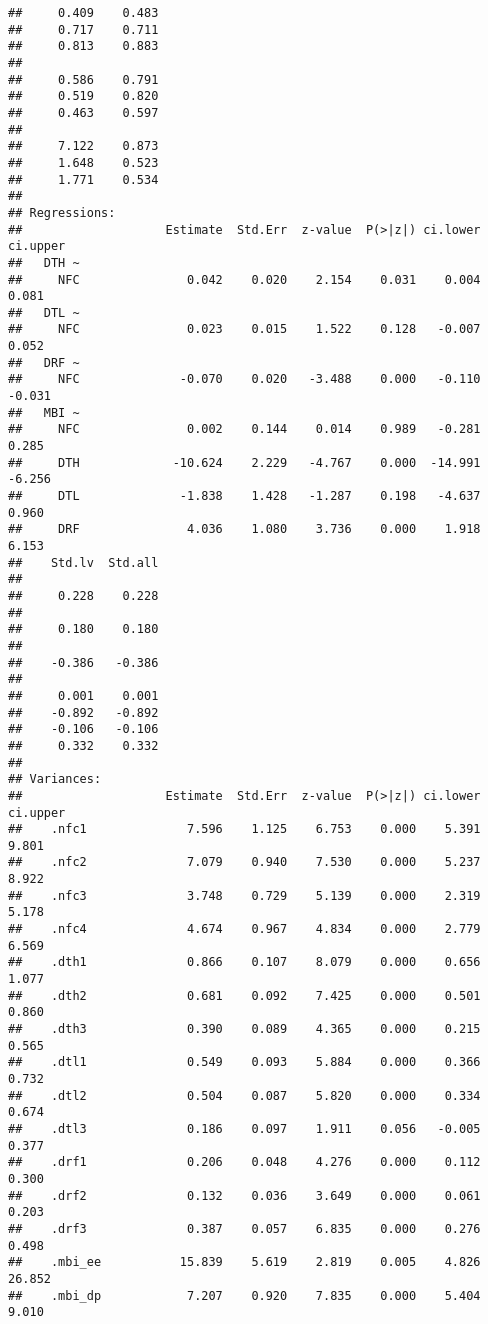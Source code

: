 \documentclass[
  english,
  man]{apa6}
\begin{document}
\begin{verbatim}
##     0.409    0.483
##     0.717    0.711
##     0.813    0.883
##                   
##     0.586    0.791
##     0.519    0.820
##     0.463    0.597
##                   
##     7.122    0.873
##     1.648    0.523
##     1.771    0.534
## 
## Regressions:
##                    Estimate  Std.Err  z-value  P(>|z|) ci.lower ci.upper
##   DTH ~                                                                 
##     NFC               0.042    0.020    2.154    0.031    0.004    0.081
##   DTL ~                                                                 
##     NFC               0.023    0.015    1.522    0.128   -0.007    0.052
##   DRF ~                                                                 
##     NFC              -0.070    0.020   -3.488    0.000   -0.110   -0.031
##   MBI ~                                                                 
##     NFC               0.002    0.144    0.014    0.989   -0.281    0.285
##     DTH             -10.624    2.229   -4.767    0.000  -14.991   -6.256
##     DTL              -1.838    1.428   -1.287    0.198   -4.637    0.960
##     DRF               4.036    1.080    3.736    0.000    1.918    6.153
##    Std.lv  Std.all
##                   
##     0.228    0.228
##                   
##     0.180    0.180
##                   
##    -0.386   -0.386
##                   
##     0.001    0.001
##    -0.892   -0.892
##    -0.106   -0.106
##     0.332    0.332
## 
## Variances:
##                    Estimate  Std.Err  z-value  P(>|z|) ci.lower ci.upper
##    .nfc1              7.596    1.125    6.753    0.000    5.391    9.801
##    .nfc2              7.079    0.940    7.530    0.000    5.237    8.922
##    .nfc3              3.748    0.729    5.139    0.000    2.319    5.178
##    .nfc4              4.674    0.967    4.834    0.000    2.779    6.569
##    .dth1              0.866    0.107    8.079    0.000    0.656    1.077
##    .dth2              0.681    0.092    7.425    0.000    0.501    0.860
##    .dth3              0.390    0.089    4.365    0.000    0.215    0.565
##    .dtl1              0.549    0.093    5.884    0.000    0.366    0.732
##    .dtl2              0.504    0.087    5.820    0.000    0.334    0.674
##    .dtl3              0.186    0.097    1.911    0.056   -0.005    0.377
##    .drf1              0.206    0.048    4.276    0.000    0.112    0.300
##    .drf2              0.132    0.036    3.649    0.000    0.061    0.203
##    .drf3              0.387    0.057    6.835    0.000    0.276    0.498
##    .mbi_ee           15.839    5.619    2.819    0.005    4.826   26.852
##    .mbi_dp            7.207    0.920    7.835    0.000    5.404    9.010

\end{verbatim}
\end{document}
